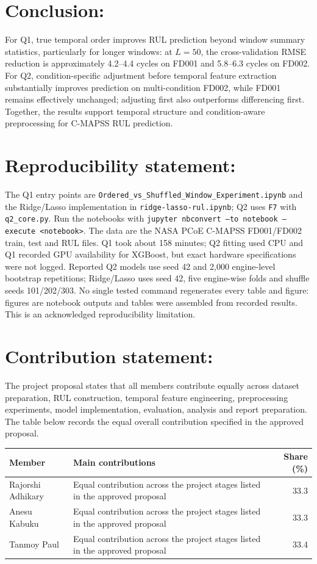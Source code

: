 \documentclass[10pt,a4paper]{article}
\begin{document}
\section{Conclusion:}
For Q1, true temporal order improves RUL prediction beyond window summary statistics, particularly for longer windows: at $L=50$, the cross-validation RMSE reduction is approximately 4.2--4.4 cycles on FD001 and 5.8--6.3 cycles on FD002. For Q2, condition-specific adjustment before temporal feature extraction substantially improves prediction on multi-condition FD002, while FD001 remains effectively unchanged; adjusting first also outperforms differencing first. Together, the results support temporal structure and condition-aware preprocessing for C-MAPSS RUL prediction.

\section*{Reproducibility statement:}
The Q1 entry points are \texttt{Ordered\_vs\_Shuffled\_Window\_Experiment.ipynb} and the Ridge/Lasso implementation in \texttt{ridge-lasso-rul.ipynb}; Q2 uses \texttt{F7} with \texttt{q2\_core.py}. Run the notebooks with \texttt{jupyter nbconvert --to notebook --execute <notebook>}. The data are the NASA PCoE C-MAPSS FD001/FD002 train, test and RUL files. Q1 took about 158 minutes; Q2 fitting used CPU and Q1 recorded GPU availability for XGBoost, but exact hardware specifications were not logged. Reported Q2 models use seed 42 and 2,000 engine-level bootstrap repetitions; Ridge/Lasso uses seed 42, five engine-wise folds and shuffle seeds 101/202/303. No single tested command regenerates every table and figure: figures are notebook outputs and tables were assembled from recorded results. This is an acknowledged reproducibility limitation.
\clearpage
\section*{Contribution statement:}
The project proposal states that all members contribute equally across dataset preparation, RUL construction, temporal feature engineering, preprocessing experiments, model implementation, evaluation, analysis and report preparation. The table below records the equal overall contribution specified in the approved proposal.
\begin{center}\begin{tabularx}{\linewidth}{@{}lYr@{}}\toprule
Member & Main contributions & Share (\%)\\\midrule
Rajorshi Adhikary & Equal contribution across the project stages listed in the approved proposal & 33.3\\
Anesu Kabuku & Equal contribution across the project stages listed in the approved proposal & 33.3\\
Tanmoy Paul & Equal contribution across the project stages listed in the approved proposal & 33.4\\\bottomrule
\end{tabularx}\end{center}
\end{document}
